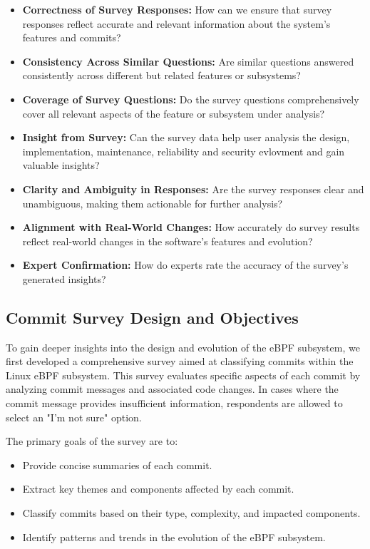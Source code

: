 \begin{itemize}
    \item \textbf{Correctness of Survey Responses:} How can we ensure that survey responses reflect accurate and relevant information about the system's features and commits?
    \item \textbf{Consistency Across Similar Questions:} Are similar questions answered consistently across different but related features or subsystems?
    \item \textbf{Coverage of Survey Questions:} Do the survey questions comprehensively cover all relevant aspects of the feature or subsystem under analysis?
    \item \textbf{Insight from Survey:} Can the survey data help user analysis the design, implementation, maintenance, reliability and security evlovment and gain valuable insights?
    \item \textbf{Clarity and Ambiguity in Responses:} Are the survey responses clear and unambiguous, making them actionable for further analysis?
    \item \textbf{Alignment with Real-World Changes:} How accurately do survey results reflect real-world changes in the software’s features and evolution?
    \item \textbf{Expert Confirmation:} How do experts rate the accuracy of the survey's generated insights?
\end{itemize}

\subsection{Commit Survey Design and Objectives}

To gain deeper insights into the design and evolution of the eBPF subsystem, we first developed a comprehensive survey aimed at classifying commits within the Linux eBPF subsystem. This survey evaluates specific aspects of each commit by analyzing commit messages and associated code changes. In cases where the commit message provides insufficient information, respondents are allowed to select an "I'm not sure" option.

The primary goals of the survey are to:

\begin{itemize} \item Provide concise summaries of each commit. \item Extract key themes and components affected by each commit. \item Classify commits based on their type, complexity, and impacted components. \item Identify patterns and trends in the evolution of the eBPF subsystem. \end{itemize}

